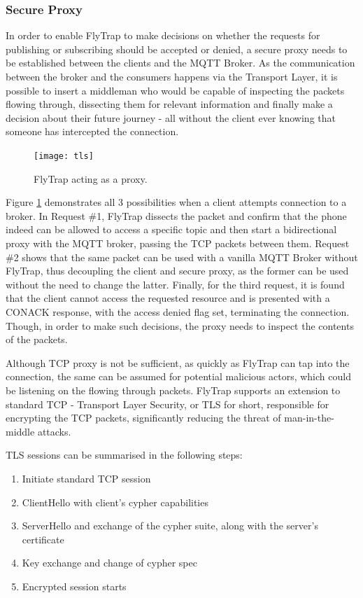 \subsubsection{Secure Proxy}
In order to enable FlyTrap to make decisions on whether the requests for publishing or subscribing should be accepted or denied, a secure proxy needs to be established between the clients and the MQTT Broker. As the communication between the broker and the consumers happens via the Transport Layer, it is possible to insert a middleman who would be capable of inspecting the packets flowing through, dissecting them for relevant information and finally make a decision about their future journey - all without the client ever knowing that someone has intercepted the connection. 

\begin{figure}[h]
    \centering
    \texttt{[image: tls]}
    \caption{FlyTrap acting as a proxy.}
    \label{fig:tls}
\end{figure}

Figure \ref{fig:tls} demonstrates all 3 possibilities when a client attempts connection to a broker. In Request \#1, FlyTrap dissects the packet and confirm that the phone indeed can be allowed to access a specific topic and then start a bidirectional proxy with the MQTT broker, passing the TCP packets between them. Request \#2 shows that the same packet can be used with a vanilla MQTT Broker without FlyTrap, thus decoupling the client and secure proxy, as the former can be used without the need to change the latter. Finally, for the third request, it is found that the client cannot access the requested resource and is presented with a CONACK response, with the access denied flag set, terminating the connection. Though, in order to make such decisions, the proxy needs to inspect the contents of the packets.

Although TCP proxy is not be sufficient, as quickly as FlyTrap can tap into the connection, the same can be assumed for potential malicious actors, which could be listening on the flowing through packets. FlyTrap supports an extension to standard TCP - Transport Layer Security, or TLS for short, responsible for encrypting the TCP packets, significantly reducing the threat of man-in-the-middle attacks.

TLS sessions can be summarised in the following steps:
\begin{enumerate}
\item Initiate standard TCP session
\item ClientHello with client's cypher capabilities 
\item ServerHello and exchange of the cypher suite, along with the server's certificate
\item Key exchange and change of cypher spec
\item Encrypted session starts
\end{enumerate}

